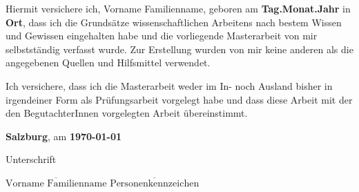 
Hiermit versichere ich, Vorname Familienname, geboren am \textbf{Tag.Monat.Jahr} in \textbf{Ort}, dass ich die Grundsätze wissenschaftlichen Arbeitens nach bestem Wissen und Gewissen eingehalten habe und die vorliegende Masterarbeit von mir selbstständig verfasst wurde. Zur Erstellung wurden von mir keine anderen als die angegebenen Quellen und Hilfsmittel verwendet. 

Ich versichere, dass ich die Masterarbeit weder im In- noch Ausland bisher in irgendeiner Form als Prüfungsarbeit vorgelegt habe und dass diese Arbeit mit der den BegutachterInnen vorgelegten Arbeit übereinstimmt.


\vspace*{3cm}

\textbf{Salzburg}, am \textbf{\today}


\hfill


Unterschrift

\vspace*{1cm}

\hfill \imatrikel\hspace*{1cm}\newline
$\overline{\text{Vorname Familienname}}$ \hfill	$\overline{\text{Personenkennzeichen}}$
